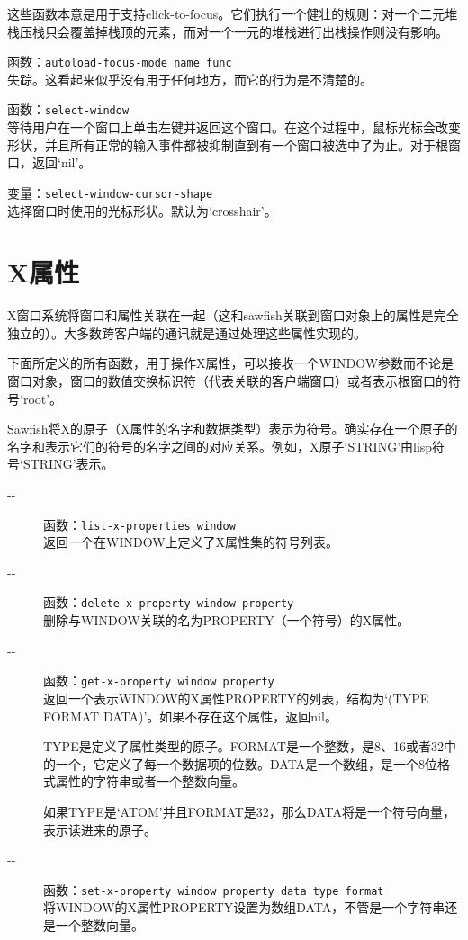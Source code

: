 \documentclass{book}
\begin{document}
\begin{CJK*}{UTF8}{gbsn}
\begin{description}
这些函数本意是用于支持click-to-focus。它们执行一个健壮的规则：对一个二元堆栈压栈只会覆盖掉栈顶的元素，而对一个一元的堆栈进行出栈操作则没有影响。
\item[-{}-] 函数：\verb|autoload-focus-mode name func|\\
失踪。这看起来似乎没有用于任何地方，而它的行为是不清楚的。
\item[-{}-] 函数：\verb|select-window|\\
等待用户在一个窗口上单击左键并返回这个窗口。在这个过程中，鼠标光标会改变形状，并且所有正常的输入事件都被抑制直到有一个窗口被选中了为止。对于根窗口，返回`nil'。
\item[-{}-] 变量：\verb|select-window-cursor-shape|\\
选择窗口时使用的光标形状。默认为`crosshair'。
\end{description}
\section{X属性}
X窗口系统将窗口和属性关联在一起（这和sawfish关联到窗口对象上的属性是完全独立的）。大多数跨客户端的通讯就是通过处理这些属性实现的。

下面所定义的所有函数，用于操作X属性，可以接收一个WINDOW参数而不论是窗口对象，窗口的数值交换标识符（代表关联的客户端窗口）或者表示根窗口的符号`root'。

Sawfish将X的原子（X属性的名字和数据类型）表示为符号。确实存在一个原子的名字和表示它们的符号的名字之间的对应关系。例如，X原子`STRING'由lisp符号`STRING'表示。
\begin{description}
\item[-{}-] 函数：\verb|list-x-properties window|\\
返回一个在WINDOW上定义了X属性集的符号列表。
\item[-{}-] 函数：\verb|delete-x-property window property|\\
删除与WINDOW关联的名为PROPERTY（一个符号）的X属性。
\item[-{}-] 函数：\verb|get-x-property window property|\\
返回一个表示WINDOW的X属性PROPERTY的列表，结构为`(TYPE FORMAT DATA)'。如果不存在这个属性，返回nil。

TYPE是定义了属性类型的原子。FORMAT是一个整数，是8、16或者32中的一个，它定义了每一个数据项的位数。DATA是一个数组，是一个8位格式属性的字符串或者一个整数向量。

如果TYPE是`ATOM'并且FORMAT是32，那么DATA将是一个符号向量，表示读进来的原子。
\item[-{}-] 函数：\verb|set-x-property window property data type format|\\
将WINDOW的X属性PROPERTY设置为数组DATA，不管是一个字符串还是一个整数向量。


\end{description}
\end{CJK*}
\end{document}
